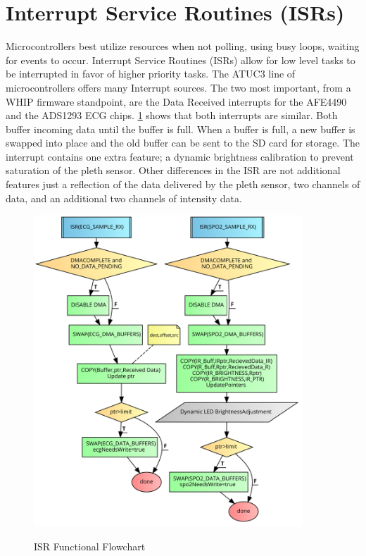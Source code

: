 \section {Interrupt Service Routines (ISRs)}
Microcontrollers best utilize resources when not polling, using busy loops, waiting for events to occur. Interrupt Service Routines (ISRs) allow for low level tasks to be interrupted in favor of higher priority tasks. The ATUC3 line of microcontrollers offers many Interrupt sources. The two most important, from a WHIP firmware standpoint, are the Data Received interrupts for the AFE4490  and the ADS1293 ECG chips. \cref{fig:flowchart_ISR} shows that both interrupts are similar. Both buffer incoming data until the buffer is full. When a buffer is full, a new buffer is swapped into place and the old buffer can be sent to the SD card for storage. The  interrupt contains one extra feature; a dynamic brightness calibration to prevent saturation of the pleth sensor. Other differences in the  ISR are not additional features just a reflection of the data delivered by the pleth sensor, two channels of data, and an additional two channels of intensity data.
\begin{figure}
	\begin{center}
		\label{fig:flowchart_ISR}
		\includegraphics[scale=1,width=0.9\textwidth]{Images/FlowChartISR.pdf} 
		\caption{ISR Functional Flowchart}
	\end{center}
\end{figure}

